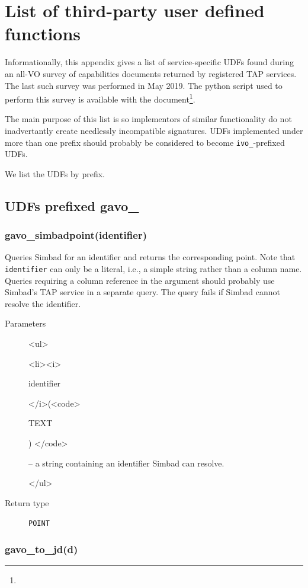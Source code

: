 \documentclass[11pt,a4paper]{ivoa}
\newenvironment{args}%
{\begin{html}<ul>\end{html}\def\arg##1(##2){\begin{html}<li><i>\end{html}%
  ##1 \begin{html}</i>(<code>\end{html}##2\begin{html}) </code>\end{html}}}%
{\begin{html}</ul>\end{html}}
\begin{document}
\appendix

\section{List of third-party user defined functions}
\label{app:otherudfs}

Informationally, this appendix gives a list of service-specific UDFs
found during an all-VO survey of capabilities documents returned by
registered TAP services.  The last such survey was performed in May
2019.  The python script used to perform this survey is available
with the document\footnote{}.

The main purpose of this list is so implementors of similar
functionality do not inadvertantly create needlessly incompatible
signatures.  UDFs implemented under more than one prefix should probably
be considered to become \verb|ivo_|-prefixed UDFs.

We list the UDFs by prefix.

\subsection{UDFs prefixed gavo\_}

\subsubsection{gavo\_simbadpoint(identifier)}

Queries Simbad for an identifier and returns the corresponding point.
Note that \texttt{identifier} can only be a literal, i.e., a simple string
rather than a column name.  Queries requiring a column reference in the
argument should probably use Simbad's TAP service in a separate query.
The query fails if Simbad cannot resolve the identifier.

\begin{description}
\item[Parameters]
\begin{args}
	\arg identifier (TEXT) -- a string containing an identifier Simbad can
	resolve.
\end{args}

\item[Return type] \texttt{POINT}
\end{description}

\subsubsection{gavo\_to\_jd(d)}
\end{document}
